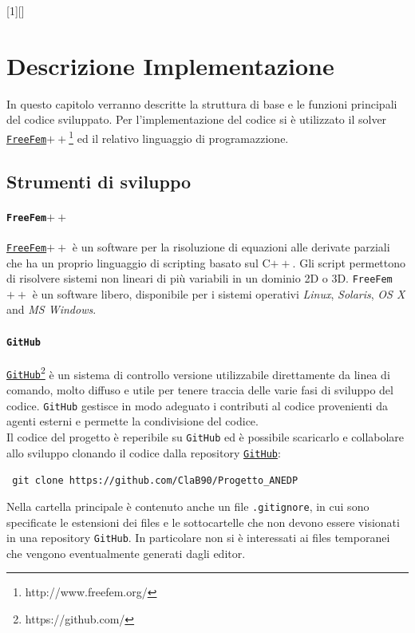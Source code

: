 [1][]{}{}

\chapter{Descrizione Implementazione}
\label{chap:Code}

In questo capitolo verranno descritte la struttura di base e le funzioni principali del codice sviluppato.
Per l'implementazione del codice si è utilizzato il solver \href{http://www.freefem.org/}\texttt{FreeFem$++$}\footnote{http://www.freefem.org/} ed il relativo linguaggio di programazzione.

\section{Strumenti di sviluppo}
\subsubsection{\texttt{FreeFem$++$}}
\href{http://www.freefem.org/}\texttt{FreeFem$++$} è un software per la risoluzione di equazioni alle derivate parziali che ha un proprio linguaggio di scripting basato sul C$++$. Gli script permettono di risolvere sistemi non lineari di più variabili in un dominio 2D o 3D.
\texttt{FreeFem$++$} è un software libero, disponibile per i sistemi operativi \textit{Linux}, \textit{Solaris}, \textit{OS X} and \textit{MS Windows}.

\subsubsection{\texttt{GitHub}}
\href{https://github.com/}{\texttt{GitHub}}\footnote{https://github.com/} è un sistema di controllo versione utilizzabile direttamente da linea di comando, molto diffuso e utile per tenere traccia delle varie fasi di sviluppo del codice. \texttt{GitHub} gestisce in modo adeguato i contributi al codice provenienti da agenti esterni e permette la condivisione del codice.\\
Il codice del progetto è reperibile su \texttt{GitHub} ed è possibile scaricarlo e collabolare allo sviluppo clonando il codice dalla repository  \href{https://github.com/}{\texttt{GitHub}}:\\
\begin{center}
\texttt{ git clone https://github.com/ClaB90/Progetto\_ANEDP}
\end{center}
Nella cartella principale è contenuto anche un file \texttt{.gitignore}, in cui sono specificate le estensioni dei files e le sottocartelle che non devono essere visionati in una repository \texttt{GitHub}. In particolare non si è interessati ai files temporanei che vengono eventualmente generati dagli editor.

